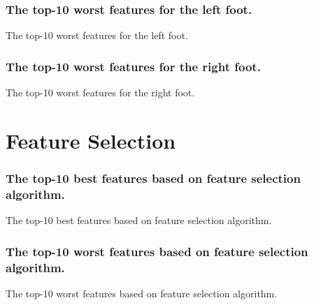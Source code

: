 \documentclass{beamer}
\begin{document}
\begin{frame}[shrink=10]
\frametitle{The top-10 worst features for the left foot.}
\tiny
\begin{table}
\begin{adjustbox}
\centering
\caption{\small The top-10 worst features for the left foot.}

\end{adjustbox}
\end{table}
\end{frame}

\begin{frame}[shrink=10]
\frametitle{The top-10 worst features for the right foot.}
\tiny
\begin{table}
\begin{adjustbox}
\centering
\caption{\small The top-10 worst features for the right foot.}

\end{adjustbox}
\end{table}
\end{frame}


\section{Feature Selection}
\begin{frame}[shrink=10]
\frametitle{The top-10 best features based on feature selection algorithm.}
\tiny
\begin{table}
\begin{adjustbox}
\centering
\caption{\small The top-10 best features based on feature selection algorithm.}

\end{adjustbox}
\end{table}
\end{frame}

\begin{frame}[shrink=10]
\frametitle{The top-10 worst features based on feature selection algorithm.}
\tiny
\begin{table}
\begin{adjustbox}
\centering
\caption{\small The top-10 worst features based on feature selection algorithm.}

\end{adjustbox}
\end{table}
\end{frame}
\end{document}
